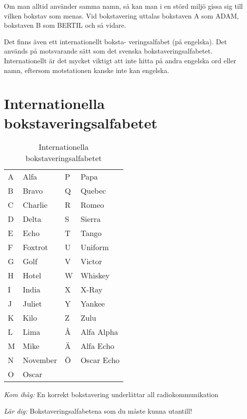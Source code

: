 Om man alltid använder samma namn, så kan man i en störd miljö gissa
sig till vilken bokstav som menas. Vid bokstavering uttalas bokstaven
A som ADAM, bokstaven B som BERTIL och så vidare.

Det finns även ett internationellt boksta- veringsalfabet (på
engelska). Det används på motsvarande sätt som det svenska
bokstaveringsalfabetet. Internationellt är det mycket viktigt att inte
hitta på andra engelska ord eller namn, eftersom motstationen kanske
inte kan engelska.

\section{Internationella bokstaveringsalfabetet}

\begin{table}[h]
  \begin{tabular}{ll|ll}
    A & Alfa     & P & Papa  \\
    B & Bravo    & Q & Quebec\\
    C & Charlie  & R & Romeo\\
    D & Delta    & S & Sierra\\
    E & Echo     & T & Tango\\
    F & Foxtrot  & U & Uniform\\
    G & Golf     & V & Victor\\
    H & Hotel    & W & Whiskey \\
    I & India    & X & X-Ray\\
    J & Juliet   & Y & Yankee\\
    K & Kilo     & Z & Zulu\\
    L & Lima     & Å & Alfa Alpha\\
    M & Mike     & Ä & Alfa Echo\\
    N & November & Ö & Oscar Echo\\
    O & Oscar    & & \\
  \end{tabular}
  \caption{Internationella bokstaveringsalfabetet}
  \label{tab:int-bokstavering}
\end{table}

\emph{Kom ihåg:}
En korrekt bokstavering underlättar all radiokommunikation

\emph{Lär dig:}
Bokstaveringsalfabetena som du måste kunna utantill!
